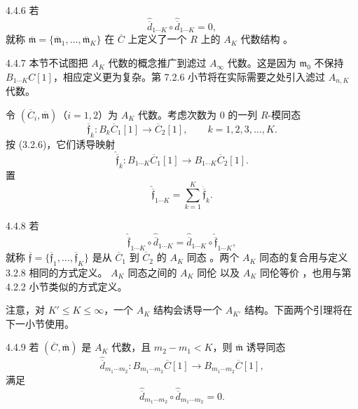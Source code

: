\begin{definition}{4.4.6}\label{def:4-4-6}
若
\[
 \widehat{\overline d}_{1\cdots K}
 \circ\widehat{\overline d}_{1\cdots K}=0,
\]
就称 $\overline{\mathfrak m}
=\{\overline{\mathfrak m}_1,\ldots,\overline{\mathfrak m}_K\}$
在 $\overline C$ 上定义了一个 $R$ 上的 $A_K$ 代数结构
。
\end{definition}

\begin{remark}{4.4.7}\label{rem:4-4-7}
本节不试图把 $A_K$ 代数的概念推广到滤过 $A_\infty$ 代数。这是因为
$\mathfrak m_0$ 不保持 $B_{1\cdots K}C[1]$，相应定义更为复杂。第
7.2.6 小节将在实际需要之处引入滤过 $A_{n,K}$ 代数。
\end{remark}

令 $(\overline C_i,\overline{\mathfrak m})$（$i=1,2$）为
$A_K$ 代数。考虑次数为 $0$ 的一列 $R$-模同态
\[
 \overline{\mathfrak f}_k\colon
 B_k\overline C_1[1]\longrightarrow\overline C_2[1],
 \qquad k=1,2,3,\ldots,K.
\]
按 (3.2.6)，它们诱导映射
\[
 \widehat{\overline{\mathfrak f}}_k\colon
 B_{1\cdots K}\overline C_1[1]
 \longrightarrow B_{1\cdots K}\overline C_2[1].
\]
置
\[
 \widehat{\overline{\mathfrak f}}_{1\cdots K}
 =\sum_{k=1}^K\widehat{\overline{\mathfrak f}}_k.
\]

\begin{definition}{4.4.8}\label{def:4-4-8}
若
\[
 \widehat{\overline{\mathfrak f}}_{1\cdots K}
 \circ\widehat{\overline d}_{1\cdots K}
 =\widehat{\overline d}_{1\cdots K}
 \circ\widehat{\overline{\mathfrak f}}_{1\cdots K},
\]
就称
$\overline{\mathfrak f}
=\{\overline{\mathfrak f}_1,\ldots,\overline{\mathfrak f}_K\}$
是从 $\overline C_1$ 到 $\overline C_2$ 的 $A_K$ 同态
。两个 $A_K$ 同态的复合用与定义 3.2.8 相同的方式定义。
$A_K$ 同态之间的 $A_K$ 同伦 以及 $A_K$ 同伦等价
，也用与第 4.2.2 小节类似的方式定义。
\end{definition}

注意，对 $K'\leq K\leq\infty$，一个 $A_K$ 结构会诱导一个
$A_{K'}$ 结构。下面两个引理将在下一小节使用。

\begin{lemma}{4.4.9}\label{lem:4-4-9}
若 $(\overline C,\overline{\mathfrak m})$ 是 $A_K$ 代数，且
$m_2-m_1<K$，则 $\overline{\mathfrak m}$ 诱导同态
\[
 \widehat{\overline d}_{m_1\cdots m_2}\colon
 B_{m_1\cdots m_2}\overline C[1]
 \longrightarrow B_{m_1\cdots m_2}\overline C[1],
\]
满足
\[
 \widehat{\overline d}_{m_1\cdots m_2}
 \circ\widehat{\overline d}_{m_1\cdots m_2}=0.
\]
\end{lemma}

